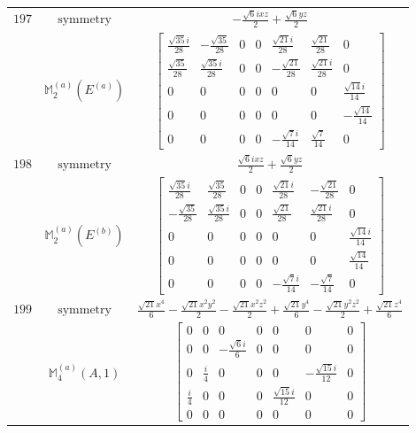 \documentclass[fleqn,8pt,landscape]{jsarticle}
\begin{document}
\begin{longtable}{ccc}
$ 197 $ & $ \text{symmetry} $ & $ - \frac{\sqrt{6} i x z}{2} + \frac{\sqrt{6} y z}{2} $ \\
$  $ & $ \mathbb{M}_{2}^{(a)}(E^{(a)}) $ & $ \begin{bmatrix} \frac{\sqrt{35} i}{28} & - \frac{\sqrt{35}}{28} & 0 & 0 & \frac{\sqrt{21} i}{28} & \frac{\sqrt{21}}{28} & 0 \\ \frac{\sqrt{35}}{28} & \frac{\sqrt{35} i}{28} & 0 & 0 & - \frac{\sqrt{21}}{28} & \frac{\sqrt{21} i}{28} & 0 \\ 0 & 0 & 0 & 0 & 0 & 0 & \frac{\sqrt{14} i}{14} \\ 0 & 0 & 0 & 0 & 0 & 0 & - \frac{\sqrt{14}}{14} \\ 0 & 0 & 0 & 0 & - \frac{\sqrt{7} i}{14} & \frac{\sqrt{7}}{14} & 0 \end{bmatrix} $ \\ \hline
$ 198 $ & $ \text{symmetry} $ & $ \frac{\sqrt{6} i x z}{2} + \frac{\sqrt{6} y z}{2} $ \\
$  $ & $ \mathbb{M}_{2}^{(a)}(E^{(b)}) $ & $ \begin{bmatrix} \frac{\sqrt{35} i}{28} & \frac{\sqrt{35}}{28} & 0 & 0 & \frac{\sqrt{21} i}{28} & - \frac{\sqrt{21}}{28} & 0 \\ - \frac{\sqrt{35}}{28} & \frac{\sqrt{35} i}{28} & 0 & 0 & \frac{\sqrt{21}}{28} & \frac{\sqrt{21} i}{28} & 0 \\ 0 & 0 & 0 & 0 & 0 & 0 & \frac{\sqrt{14} i}{14} \\ 0 & 0 & 0 & 0 & 0 & 0 & \frac{\sqrt{14}}{14} \\ 0 & 0 & 0 & 0 & - \frac{\sqrt{7} i}{14} & - \frac{\sqrt{7}}{14} & 0 \end{bmatrix} $ \\ \hline
$ 199 $ & $ \text{symmetry} $ & $ \frac{\sqrt{21} x^{4}}{6} - \frac{\sqrt{21} x^{2} y^{2}}{2} - \frac{\sqrt{21} x^{2} z^{2}}{2} + \frac{\sqrt{21} y^{4}}{6} - \frac{\sqrt{21} y^{2} z^{2}}{2} + \frac{\sqrt{21} z^{4}}{6} $ \\
$  $ & $ \mathbb{M}_{4}^{(a)}(A,1) $ & $ \begin{bmatrix} 0 & 0 & 0 & 0 & 0 & 0 & 0 \\ 0 & 0 & - \frac{\sqrt{6} i}{6} & 0 & 0 & 0 & 0 \\ 0 & \frac{i}{4} & 0 & 0 & 0 & - \frac{\sqrt{15} i}{12} & 0 \\ \frac{i}{4} & 0 & 0 & 0 & \frac{\sqrt{15} i}{12} & 0 & 0 \\ 0 & 0 & 0 & 0 & 0 & 0 & 0 \end{bmatrix} $ \\ \hline

\end{longtable}
\end{document}
